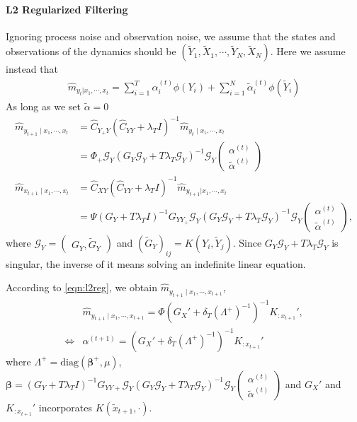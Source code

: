 \documentclass[a4paper]{article}
\newcommand{\up}{\mathrm}
\renewcommand{\cal}{\mathcal}
\newcommand{\bs}{\boldsymbol}
\begin{document}
\paragraph{L2 Regularized Filtering}
Ignoring process noise and observation noise, we assume that the states and observations of the dynamics should be $(\tilde{Y}_1,\tilde{X}_1,\cdots,\tilde{Y}_N,\tilde{X}_N)$. Here we assume instead that 
\begin{align}
\hat{m}_{y_t|x_1,\cdots,x_t} = \sum_{i=1}^T \alpha_i^{(t)} \phi(Y_i) + \sum_{i=1}^N \tilde{\alpha}_i^{(t)} \phi(\tilde{Y}_i)
\end{align}
As long as we set $\tilde{\alpha} = 0$
\begin{align}
\hat{m}_{y_{t+1}\mid x_1,\cdots,x_t} &= \hat{C}_{Y_{+}Y}(\hat{C}_{YY}+\lambda_T I)^{-1}\hat{m}_{y_t\mid x_1,\cdots,x_t} \\
&= \Phi_{+}\cal{G}_Y(G_Y\cal{G}_Y + T\lambda_T \cal{G}_Y)^{-1}\cal{G}_Y \begin{pmatrix}
\alpha^{(t)}\\
\tilde{\alpha}^{(t)}
\end{pmatrix}\\
\hat{m}_{x_{t+1}\mid x_1,\cdots,x_t} &= \hat{C}_{XY}(\hat{C}_{YY} + \lambda_{T}I)^{-1}\hat{m}_{y_{t+1}|x_1,\cdots,x_t} \\
&= \Psi(G_{Y} + T\lambda_T I)^{-1} G_{YY_+}\cal{G}_Y(G_Y\cal{G}_Y + T\lambda_T \cal{G}_Y)^{-1}\cal{G}_Y \begin{pmatrix}
\alpha^{(t)}\\
\tilde{\alpha}^{(t)}
\end{pmatrix},
\end{align}
where
$
\cal{G}_Y = \begin{pmatrix}
G_Y, \tilde{G}_Y
\end{pmatrix}
$
and $(\tilde{G}_Y)_{ij} = K(Y_i,\tilde{Y}_j)$. Since $G_Y\cal{G}_Y + T\lambda_T \cal{G}_Y$ is singular, the inverse of it means solving an indefinite linear equation.

According to \eqref{eqn:l2reg}, we obtain $\hat{m}_{y_{t+1}\mid x_1,\cdots,x_{t+1}}$,
\begin{align}
&\hat{m}_{y_{t+1}\mid x_1,\cdots,x_{t+1}} = \Phi(G_X' + \delta_T (\Lambda^+)^{-1})^{-1} K_{:x_{t+1}}',\\
\Leftrightarrow& \alpha^{(t+1)} = (G_X' + \delta_T (\Lambda^+)^{-1})^{-1} K_{:x_{t+1}}'
\end{align}
where $\Lambda^+ = \up{diag}(\bs{\beta}^+,\mu)$, $\bs{\beta} = (G_Y + T\lambda_T I)^{-1}G_{YY+}\cal{G}_Y(G_Y\cal{G}_Y + T\lambda_T \cal{G}_Y)^{-1}\cal{G}_Y \begin{pmatrix}
\alpha^{(t)}\\
\tilde{\alpha}^{(t)}
\end{pmatrix}$ and $G_X'$ and $K_{:x_{t+1}}'$ incorporates $K(\tilde{x}_{t+1},\cdot)$.
\end{document}

